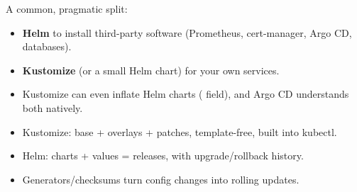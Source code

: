 A common, pragmatic split:

\begin{itemize}
  \item \textbf{Helm} to install third-party software (Prometheus, cert-manager,
        Argo CD, databases).
  \item \textbf{Kustomize} (or a small Helm chart) for your own services.
  \item Kustomize can even inflate Helm charts ( field), and
        Argo CD understands both natively.
\end{itemize}

\begin{recap}
\begin{itemize}
  \item Kustomize: base + overlays + patches, template-free, built into kubectl.
  \item Helm: charts + values = releases, with upgrade/rollback history.
  \item Generators/checksums turn config changes into rolling updates.
\end{itemize}
\end{recap}
